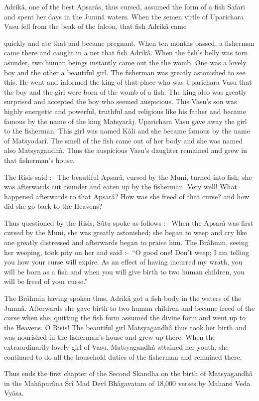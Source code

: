 Adrik\^a, one of the best Apsar\^as, thus cursed, assumed the form of a fish Safari and spent her days in the Jumn\^a waters. When the semen virile of Uparichara Vasu fell from the beak of the falcon, that fish Adrik\^a came

quickly and ate that and became pregnant. When ten months passed, a fisherman came there and caught in a net that fish Adrik\^a. When the fish's belly was torn asunder, two human beings instantly came out the the womb. One was a lovely boy and the other a beautiful girl. The fisherman was greatly astonished to see this. He went and informed the king of that place who was Uparichara Vasu that the boy and the girl were born of the womb of a fish. The king also was greatly surprised and accepted the boy who seemed auspicious. This Vasu's son was highly energetic and powerful, truthful and religious like his father and became famous by the name of the king Matsyar\^aj. Uparichara Vasu gave away the girl to the fisherman. This girl was named K\^ali and she became famous by the name of Matsyodar\^i. The smell of the fish came out of her body and she was named also Matsyagandh\^a. Thus the auspicious Vasu's daughter remained and grew in that fisherman's house.

The Risis said :-- The beautiful Apsar\^a, cursed by the Muni, turned into fish; she was afterwards cut asunder and eaten up by the fisherman. Very well! What happened afterwards to that Apsar\^a? How was she freed of that curse? and how did she go back to the Heavens?

Thus questioned by the Risis, S\^uta spoke as follows :-- When the Apsar\^a was first cursed by the Muni, she was greatly astonished; she began to weep and cry like one greatly distressed and afterwards began to praise him. The Br\^ahmin, seeing her weeping, took pity on her and said :-- ``O good one! Don't weep; I am telling you how your curse will expire. As an effect of having incurred my wrath, you will be born as a fish and when you will give birth to two human children, you will be freed of your curse.''

The Br\^ahmin having spoken thus, Adrik\^a got a fish-body in the waters of the Jumn\^a. Afterwards she gave birth to two human children and became freed of the curse when she, quitting the fish form assumed the divine form and went up to the Heavens. O Risis! The beautiful girl Matsyagandh\^a thus took her birth and was nourished in the fisherman's house and grew up there. When the extraordinarily lovely girl of Vasu, Matsyagandh\^a attained her youth, she continued to do all the household duties of the fisherman and remained there.

Thus ends the first chapter of the Second Skandha on the birth of Matsyagandh\^a in the Mah\^apur\^ana \'Sr\^i Mad Dev\^i Bh\^agavatam of 18,000 verses by Maharsi Veda Vy\^asa.